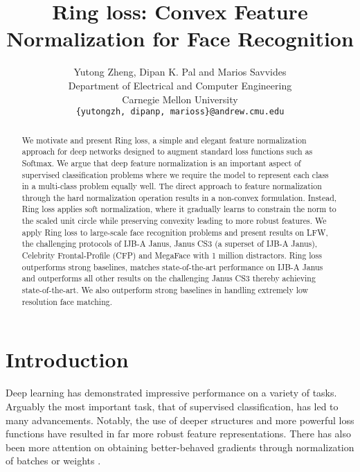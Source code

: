 \documentclass[10pt,twocolumn,letterpaper]{article}
\begin{document}
\title{Ring loss: Convex Feature Normalization for Face Recognition}




\author{Yutong Zheng, Dipan K. Pal and Marios Savvides \\
  Department of Electrical and Computer Engineering\\
  Carnegie Mellon University\\
{\tt\small \{yutongzh, dipanp, marioss\}@andrew.cmu.edu}
}

\maketitle




\begin{abstract}
We motivate and present Ring loss, a simple and elegant feature normalization approach for deep networks designed to augment standard loss functions such as Softmax. We argue that deep feature normalization is an important aspect of supervised classification problems where we require the model to represent each class in a multi-class problem equally well. The direct approach to feature normalization through the hard normalization operation results in a non-convex formulation. Instead, Ring loss applies soft normalization, where it gradually learns to constrain the norm to the scaled unit circle while preserving convexity leading to more robust features. We apply Ring loss to large-scale face recognition problems and present results on LFW, the challenging protocols of IJB-A Janus, Janus CS3 (a superset of IJB-A Janus), Celebrity Frontal-Profile (CFP) and MegaFace with 1 million distractors. Ring loss outperforms strong baselines, matches state-of-the-art performance on IJB-A Janus and outperforms all other results on the challenging Janus CS3 thereby achieving state-of-the-art. We also outperform strong baselines in handling extremely low resolution face matching.
\end{abstract}









\section{Introduction}



Deep learning has demonstrated impressive performance on a variety of tasks. Arguably the most important task, that of supervised classification, has led to many advancements. Notably, the use of deeper structures  \cite{simonyan2014very, szegedy2015going, he2016deep} and more powerful loss functions \cite{hadsell2006dimensionality, schroff2015facenet, wen2016discriminative, tadmor2016learning, liu2016large} have resulted in far more robust feature representations.  There has also been more attention on obtaining better-behaved gradients through normalization of batches or weights \cite{ioffe2015batch, ba2016layer, salimans2016weight}. 
\end{document}
